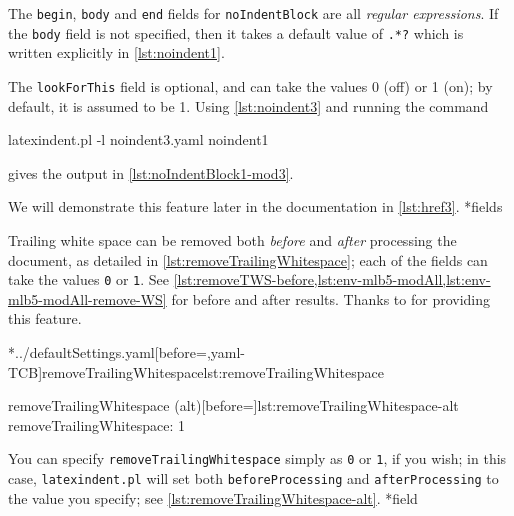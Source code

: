 
    The \texttt{begin}, \texttt{body} and \texttt{end} fields for \texttt{noIndentBlock} are all
    \emph{regular expressions}. If the \texttt{body} field is not specified, then it takes a default 
    value of \lstinline!.*?! which is written explicitly in \cref{lst:noindent1}. 
    
    The \texttt{lookForThis} field is optional, and can take the values 0 (off) or 1 (on);
    by default, it is assumed to be 1. Using \cref{lst:noindent3} and running the command
\begin{commandshell}
latexindent.pl -l noindent3.yaml noindent1
\end{commandshell}
gives the output in \cref{lst:noIndentBlock1-mod3}.


    We will demonstrate this feature later in the documentation in \cref{lst:href3}.
*{fields}\label{yaml:removeTrailingWhitespace}

	Trailing white space can be removed both \emph{before} and
	\emph{after} processing the document, as detailed in \cref{lst:removeTrailingWhitespace};
	each of the fields can take the values \texttt{0} or
	\texttt{1}. See \vref{lst:removeTWS-before,lst:env-mlb5-modAll,lst:env-mlb5-modAll-remove-WS} for before and after results. Thanks
	to \cite{vosskuhle} for providing this feature.

	\begin{minipage}{.4\textwidth}
		\cmhlistingsfromfile[style=removeTrailingWhitespace]*{../defaultSettings.yaml}[before=\centering,yaml-TCB]{removeTrailingWhitespace}{lst:removeTrailingWhitespace}
	\end{minipage}%
	\hfill
	\begin{minipage}{.5\textwidth}
		\begin{yaml}[numbers=none]{removeTrailingWhitespace (alt)}[before=\centering]{lst:removeTrailingWhitespace-alt}
removeTrailingWhitespace: 1
\end{yaml}
	\end{minipage}%

	You can specify \texttt{removeTrailingWhitespace} simply as \texttt{0} or
	\texttt{1}, if you wish; in this case,%
	 \texttt{latexindent.pl} will set both \texttt{beforeProcessing} and
	\texttt{afterProcessing} to the value you specify; see \cref{lst:removeTrailingWhitespace-alt}.
*{field}

